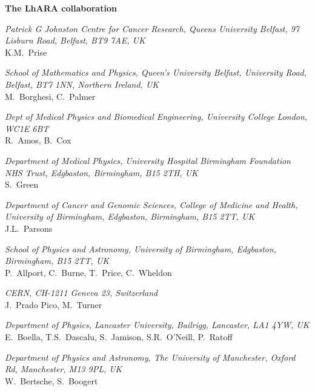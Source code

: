 \vspace{0.75cm}
\begin{center}
  {\bf \color{BlueViolet} The LhARA collaboration} \\
  \vspace{0.25cm}
\end{center}
\noindent \textit{Patrick G Johnston Centre for Cancer Research, Queens University Belfast, 97 Lisburn Road, Belfast, BT9 7AE, UK} \\
K.M.~Prise
 
\vspace{0.5cm}
\noindent \textit{School of Mathematics and Physics, Queen's University Belfast, University Road, Belfast, BT7 1NN, Northern Ireland, UK} \\
M.~Borghesi, C.~Palmer
 
\vspace{0.5cm}
\noindent \textit{Dept of Medical Physics and Biomedical Engineering, University College London, WC1E 6BT} \\
R.~Amos, B.~Cox
 
\vspace{0.5cm}
\noindent \textit{Department of Medical Physics, University Hospital Birmingham Foundation NHS Trust, Edgbaston, Birmingham, B15 2TH, UK} \\
S.~Green
 
\vspace{0.5cm}
\noindent \textit{Department of Cancer and Genomic Sciences, College of Medicine and Health, University of Birmingham, Edgbaston, Birmingham, B15 2TT, UK} \\
J.L.~Parsons
 
\vspace{0.5cm}
\noindent \textit{School of Physics and Astronomy, University of Birmingham, Edgbaston, Birmingham, B15 2TT, UK} \\
P.~Allport, C.~Burne, T.~Price, C.~Wheldon
 
\vspace{0.5cm}
\noindent \textit{CERN, CH-1211 Geneva 23, Switzerland} \\
J.~Prado Pico, M.~Turner
 
\vspace{0.5cm}
\noindent \textit{Department of Physics, Lancaster University, Bailrigg, Lancaster, LA1 4YW, UK} \\
E.~Boella, T.S.~Dascalu, S.~Jamison, S.R.~O'Neill, P.~Ratoff
 
\vspace{0.5cm}
\noindent \textit{Department of Physics and Astronomy, The University of Manchester, Oxford Rd, Manchester, M13 9PL, UK} \\
W.~Bertsche, S.~Boogert
 
